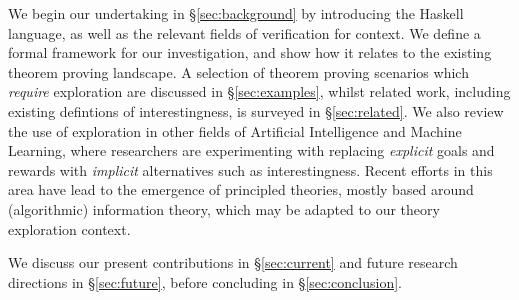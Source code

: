 We begin our undertaking in \S \ref{sec:background} by introducing the Haskell
language, as well as the relevant fields of verification for context. We define
a formal framework for our investigation, and show how it relates to the
existing theorem proving landscape. A selection of theorem proving scenarios
which \emph{require} exploration are discussed in \S \ref{sec:examples}, whilst
related work, including existing defintions of interestingness, is surveyed in
\S \ref{sec:related}. We also review the use of exploration in other fields of
Artificial Intelligence and Machine Learning, where researchers are
experimenting with replacing \emph{explicit} goals and rewards with
\emph{implicit} alternatives such as interestingness. Recent efforts in this
area have lead to the emergence of principled theories, mostly based around
(algorithmic) information theory, which may be adapted to our theory exploration
context.

We discuss our present contributions in \S \ref{sec:current} and future research
directions in \S \ref{sec:future}, before concluding in \S \ref{sec:conclusion}.
